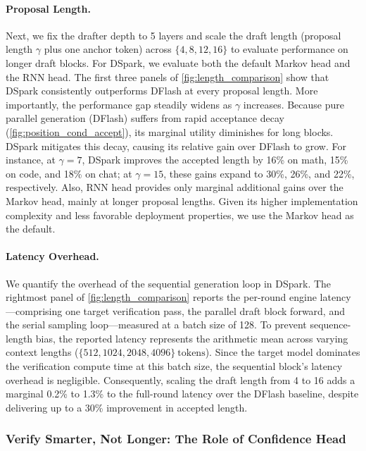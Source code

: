 \paragraph{Proposal Length.}
Next, we fix the drafter depth to 5 layers and scale the draft length (proposal length $\gamma$ plus one anchor token) across $\{4, 8, 12, 16\}$ to evaluate performance on longer draft blocks. For DSpark, we evaluate both the default Markov head and the RNN head. The first three panels of \autoref{fig:length_comparison} show that DSpark consistently outperforms DFlash at every proposal length. More importantly, the performance gap steadily widens as $\gamma$ increases. Because pure parallel generation (DFlash) suffers from rapid acceptance decay (\autoref{fig:position_cond_accept}), its marginal utility diminishes for long blocks. DSpark mitigates this decay, causing its relative gain over DFlash to grow. For instance, at $\gamma=7$, DSpark improves the accepted length by 16\% on math, 15\% on code, and 18\% on chat; at $\gamma=15$, these gains expand to 30\%, 26\%, and 22\%, respectively. Also, RNN head provides only marginal additional gains over the Markov head, mainly at longer proposal lengths. Given its higher implementation complexity and less favorable deployment properties, we use the Markov head as the default.

\paragraph{Latency Overhead.}  
We quantify the overhead of the sequential generation loop in DSpark. The rightmost panel of \autoref{fig:length_comparison} reports the per-round engine latency—comprising one target verification pass, the parallel draft block forward, and the serial sampling loop—measured at a batch size of 128. To prevent sequence-length bias, the reported latency represents the arithmetic mean across varying context lengths ($\{512, 1024, 2048, 4096\}~ \text{tokens}$). 
Since the target model dominates the verification compute time at this batch size, the sequential block's latency overhead is negligible. Consequently, scaling the draft length from 4 to 16 adds a marginal 0.2\% to 1.3\% to the full-round latency over the DFlash baseline, despite delivering up to a 30\% improvement in accepted length.  

\subsubsection{Verify Smarter, Not Longer: The Role of Confidence Head}
\label{sec:exp_confidence}

